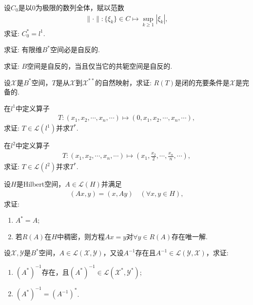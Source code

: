 \documentclass[../../main.tex]{subfiles}%
\begin{document}
\begin{example}
设$C_0$是以$0$为极限的数列全体，赋以范数
\begin{align*}
\|\cdot\|:\{\xi_k\}\in C\mapsto \sup\limits_{k\geqslant1}|\xi_k|,
\end{align*}
求证: $C_0^*=l^1$.
\end{example}

\begin{example}
求证: 有限维$B^*$空间必是自反的.
\end{example}

\begin{example}
求证: $B$空间是自反的，当且仅当它的共轭空间是自反的.
\end{example}

\begin{example}
设$\mathscr{X}$是$B^*$空间，$T$是从$\mathscr{X}$到$\mathscr{X}^{**}$的自然映射，求证: $R(T)$是闭的充要条件是$\mathscr{X}$是完备的.
\end{example}

\begin{example}
在$l^1$中定义算子
\begin{align*}
T:(x_1,x_2,\cdots,x_n,\cdots)\mapsto(0,x_1,x_2,\cdots,x_n,\cdots),
\end{align*}
求证: $T\in\mathscr{L}(l^1)$并求$T^*$.
\end{example}

\begin{example}
在$l^2$中定义算子
\begin{align*}
T:(x_1,x_2,\cdots,x_n,\cdots)\mapsto\left(x_1,\frac{x_2}{2},\cdots,\frac{x_n}{n},\cdots\right),
\end{align*}
求证: $T\in\mathscr{L}(l^2)$并求$T^*$.
\end{example}

\begin{example}
设$H$是Hilbert空间，$A\in\mathscr{L}(H)$并满足
\begin{align*}
(Ax,y)=(x,Ay)\quad(\forall x,y\in H),
\end{align*}
求证:
\begin{enumerate}[(1)]
\item $A^*=A$;
\item 若$R(A)$在$H$中稠密，则方程$Ax=y$对$\forall y\in R(A)$存在唯一解.
\end{enumerate}
\end{example}

\begin{example}
设$\mathscr{X},\mathscr{Y}$是$B^*$空间，$A\in\mathscr{L}(\mathscr{X},\mathscr{Y})$，又设$A^{-1}$存在且$A^{-1}\in\mathscr{L}(\mathscr{Y},\mathscr{X})$，求证:
\begin{enumerate}[(1)]
\item $(A^*)^{-1}$存在，且$(A^*)^{-1}\in\mathscr{L}(\mathscr{X}^*,\mathscr{Y}^*)$;
\item $(A^*)^{-1}=(A^{-1})^*$.
\end{enumerate}
\end{example}
\end{document}
